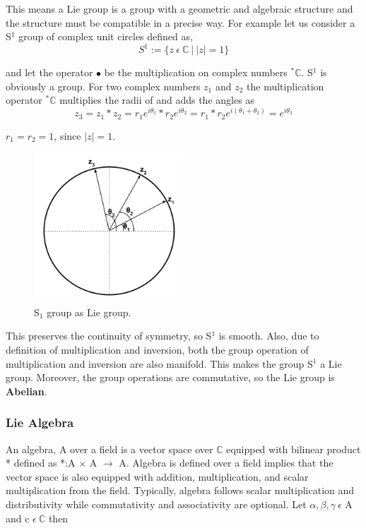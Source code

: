 This means a Lie group is a group with a geometric and algebraic structure and the structure must be compatible in a precise way. 
For example let us consider a S$^1$ group of complex unit circles defined as,
\begin{equation}
    S^1 := \{z \: \epsilon \: \mathbb{C} \: | \: |z| = 1\}
\end{equation}

and let the operator $\bullet$ be the multiplication on complex numbers $^*\mathbb{C}$. 
S$^1$ is obviously a group. For two complex numbers $z_1$ and $z_2$ the multiplication operator $^*\mathbb{C}$ multiplies the radii of and adds the angles as
\begin{equation}
    z_3 = z_1*z_2 = r_1e^{i\theta_1} * r_2e^{i\theta_2} = r_1*r_2e^{i(\theta_1+\theta_2)} = e^{i\theta_3}
\end{equation}

$r_1 = r_2 = 1$, since $|z| = 1$.
\begin{figure}[h]
    \centering
    \includegraphics[width=0.5\textwidth]{figures/S1_Lie_group.png}
    \caption{S$_1$ group as Lie group.}
\end{figure}

This preserves the continuity of symmetry, so S$^1$ is smooth. 
Also, due to definition of multiplication and inversion, both the group operation of multiplication and inversion are also manifold.
This makes the group S$^1$ a Lie group. Moreover, the group operations are commutative, so the Lie group is \textbf{Abelian}.

\subsubsection{Lie Algebra}
An algebra, A over a field is a vector space over $\mathbb{C}$ equipped with bilinear product * defined as *:A $\times$ A $\rightarrow$ A.
Algebra is defined over a field implies that the vector space is also equipped with addition, multiplication, and scalar multiplication from the field.
Typically, algebra follows scalar multiplication and distributivity while commutativity and associativity are optional.
Let $\alpha, \beta, \gamma \: \epsilon$ A and c $\epsilon \: \mathbb{C}$ then

